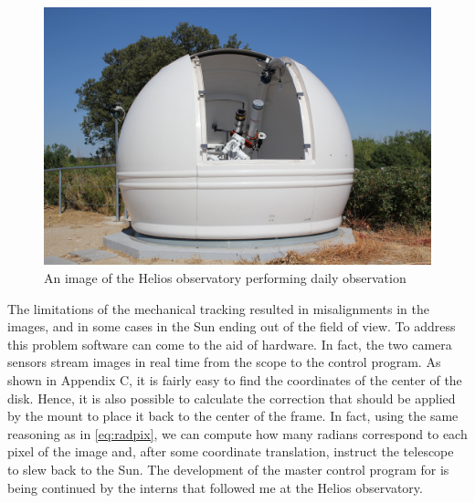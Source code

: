 \begin{figure}[t!]
    \centering
    \captionsetup{justification=centering}
    \includegraphics[width=\textwidth]{./pictures/helios}
    \caption{An image of the Helios observatory performing daily observation}
    \label{fig:halpha-visible}
\end{figure}
\noindent The limitations of the mechanical tracking resulted in misalignments in the images, and in some cases in the Sun ending out of the field of view. To address this problem software can come to the aid of hardware. In fact, the two camera sensors stream images in real time from the scope to the control program. As shown in Appendix C, it is fairly easy to find the coordinates of the center of the disk. Hence, it is also possible to calculate the correction that should be applied by the mount to place it back to the center of the frame. In fact, using the same reasoning as in \eqref{eq:radpix}, we can compute how many radians correspond to each pixel of the image and, after some coordinate translation, instruct the telescope to slew back to the Sun.
\bigbreak
\noindent The development of the master control program for is being continued by the interns that followed me at the Helios observatory.

